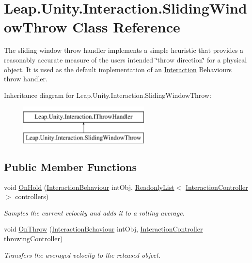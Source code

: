 \hypertarget{class_leap_1_1_unity_1_1_interaction_1_1_sliding_window_throw}{}\section{Leap.\+Unity.\+Interaction.\+Sliding\+Window\+Throw Class Reference}
\label{class_leap_1_1_unity_1_1_interaction_1_1_sliding_window_throw}


The sliding window throw handler implements a simple heuristic that provides a reasonably accurate measure of the user\textquotesingle{}s intended \char`\"{}throw direction\char`\"{} for a physical object. It is used as the default implementation of an \mbox{\hyperlink{namespace_leap_1_1_unity_1_1_interaction}{Interaction}} Behaviour\textquotesingle{}s throw handler.  


Inheritance diagram for Leap.\+Unity.\+Interaction.\+Sliding\+Window\+Throw\+:\begin{figure}[H]
\begin{center}
\leavevmode
\includegraphics[height=2.000000cm]{class_leap_1_1_unity_1_1_interaction_1_1_sliding_window_throw}
\end{center}
\end{figure}
\subsection*{Public Member Functions}
\begin{DoxyCompactItemize}
\item 
void \mbox{\hyperlink{class_leap_1_1_unity_1_1_interaction_1_1_sliding_window_throw_ae0b88c5531628875477b51d107ba1c11}{On\+Hold}} (\mbox{\hyperlink{class_leap_1_1_unity_1_1_interaction_1_1_interaction_behaviour}{Interaction\+Behaviour}} int\+Obj, \mbox{\hyperlink{struct_leap_1_1_unity_1_1_readonly_list}{Readonly\+List}}$<$ \mbox{\hyperlink{class_leap_1_1_unity_1_1_interaction_1_1_interaction_controller}{Interaction\+Controller}} $>$ controllers)
\begin{DoxyCompactList}\small\item\em Samples the current velocity and adds it to a rolling average. \end{DoxyCompactList}\item 
void \mbox{\hyperlink{class_leap_1_1_unity_1_1_interaction_1_1_sliding_window_throw_adff33de5d0a761227c5e3ebd80e12e96}{On\+Throw}} (\mbox{\hyperlink{class_leap_1_1_unity_1_1_interaction_1_1_interaction_behaviour}{Interaction\+Behaviour}} int\+Obj, \mbox{\hyperlink{class_leap_1_1_unity_1_1_interaction_1_1_interaction_controller}{Interaction\+Controller}} throwing\+Controller)
\begin{DoxyCompactList}\small\item\em Transfers the averaged velocity to the released object. \end{DoxyCompactList}\end{DoxyCompactItemize}


